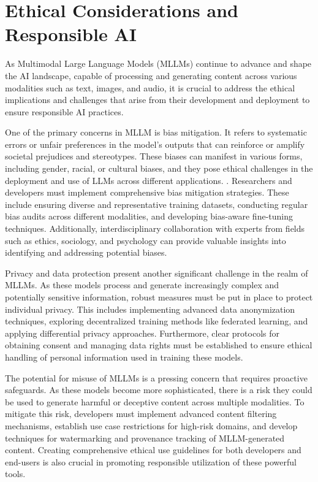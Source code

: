 \chapter{Ethical Considerations and Responsible AI}

As Multimodal Large Language Models (MLLMs) continue to advance and shape the AI landscape, capable of processing and generating content across various modalities such as text, images, and audio, it is crucial to address the ethical implications and challenges that arise from their development and deployment to ensure responsible AI practices\cite{konidena2024ethical}. 

One of the primary concerns in MLLM is bias mitigation. It refers to systematic errors or unfair preferences in the model's outputs that can reinforce or amplify societal prejudices and stereotypes. These biases can manifest in various forms, including gender, racial, or cultural biases, and they pose ethical challenges in the deployment and use of LLMs across different applications.
\cite{peng2024securing}. Researchers and developers must implement comprehensive bias mitigation strategies\cite{zhang2023mitigating}. These include ensuring diverse and representative training datasets, conducting regular bias\cite{boix2022machine} audits across different modalities\cite{pymetrics2022audit}, and developing bias-aware fine-tuning techniques\cite{kim2024domain}. Additionally, interdisciplinary collaboration with experts from fields such as ethics, sociology, and psychology can provide valuable insights into identifying and addressing potential biases\cite{aquino2023practical}.

Privacy and data protection present another significant challenge in the realm of MLLMs. As these models process and generate increasingly complex and potentially sensitive information, robust measures must be put in place to protect individual privacy\cite{he2024emerged, friha2024llm}. This includes implementing advanced data anonymization techniques, exploring decentralized training methods like federated learning, and applying differential privacy approaches. Furthermore, clear protocols for obtaining consent and managing data rights must be established to ensure ethical handling of personal information used in training these models\cite{mccoy2023ethical}.

The potential for misuse of MLLMs is a pressing concern that requires proactive safeguards. As these models become more sophisticated, there is a risk they could be used to generate harmful or deceptive content across multiple modalities\cite{chen2024trustworthy}. To mitigate this risk, developers must implement advanced content filtering mechanisms, establish use case restrictions for high-risk domains, and develop techniques for watermarking and provenance tracking of MLLM-generated content. Creating comprehensive ethical use guidelines for both developers and end-users is also crucial in promoting responsible utilization of these powerful tools.

